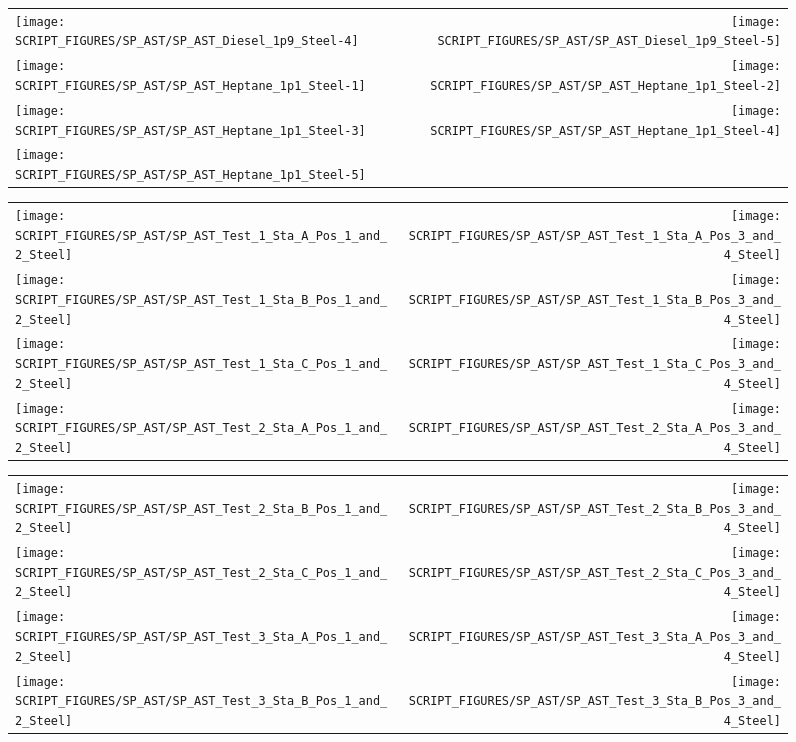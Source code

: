 \begin{figure}[p]
\begin{tabular*}{\textwidth}{l@{\extracolsep{\fill}}r}
\texttt{[image: SCRIPT\_FIGURES/SP\_AST/SP\_AST\_Diesel\_1p9\_Steel-4]} &
\texttt{[image: SCRIPT\_FIGURES/SP\_AST/SP\_AST\_Diesel\_1p9\_Steel-5]} \\
\texttt{[image: SCRIPT\_FIGURES/SP\_AST/SP\_AST\_Heptane\_1p1\_Steel-1]} &
\texttt{[image: SCRIPT\_FIGURES/SP\_AST/SP\_AST\_Heptane\_1p1\_Steel-2]} \\
\texttt{[image: SCRIPT\_FIGURES/SP\_AST/SP\_AST\_Heptane\_1p1\_Steel-3]} &
\texttt{[image: SCRIPT\_FIGURES/SP\_AST/SP\_AST\_Heptane\_1p1\_Steel-4]} \\
\texttt{[image: SCRIPT\_FIGURES/SP\_AST/SP\_AST\_Heptane\_1p1\_Steel-5]} 
\end{tabular*}
\end{figure}

\begin{figure}[p]
\begin{tabular*}{\textwidth}{l@{\extracolsep{\fill}}r}
\texttt{[image: SCRIPT\_FIGURES/SP\_AST/SP\_AST\_Test\_1\_Sta\_A\_Pos\_1\_and\_2\_Steel]} &
\texttt{[image: SCRIPT\_FIGURES/SP\_AST/SP\_AST\_Test\_1\_Sta\_A\_Pos\_3\_and\_4\_Steel]} \\
\texttt{[image: SCRIPT\_FIGURES/SP\_AST/SP\_AST\_Test\_1\_Sta\_B\_Pos\_1\_and\_2\_Steel]} &
\texttt{[image: SCRIPT\_FIGURES/SP\_AST/SP\_AST\_Test\_1\_Sta\_B\_Pos\_3\_and\_4\_Steel]} \\
\texttt{[image: SCRIPT\_FIGURES/SP\_AST/SP\_AST\_Test\_1\_Sta\_C\_Pos\_1\_and\_2\_Steel]} &
\texttt{[image: SCRIPT\_FIGURES/SP\_AST/SP\_AST\_Test\_1\_Sta\_C\_Pos\_3\_and\_4\_Steel]} \\
\texttt{[image: SCRIPT\_FIGURES/SP\_AST/SP\_AST\_Test\_2\_Sta\_A\_Pos\_1\_and\_2\_Steel]} &
\texttt{[image: SCRIPT\_FIGURES/SP\_AST/SP\_AST\_Test\_2\_Sta\_A\_Pos\_3\_and\_4\_Steel]}
\end{tabular*}
\end{figure}

\begin{figure}[p]
\begin{tabular*}{\textwidth}{l@{\extracolsep{\fill}}r}
\texttt{[image: SCRIPT\_FIGURES/SP\_AST/SP\_AST\_Test\_2\_Sta\_B\_Pos\_1\_and\_2\_Steel]} &
\texttt{[image: SCRIPT\_FIGURES/SP\_AST/SP\_AST\_Test\_2\_Sta\_B\_Pos\_3\_and\_4\_Steel]} \\
\texttt{[image: SCRIPT\_FIGURES/SP\_AST/SP\_AST\_Test\_2\_Sta\_C\_Pos\_1\_and\_2\_Steel]} &
\texttt{[image: SCRIPT\_FIGURES/SP\_AST/SP\_AST\_Test\_2\_Sta\_C\_Pos\_3\_and\_4\_Steel]} \\
\texttt{[image: SCRIPT\_FIGURES/SP\_AST/SP\_AST\_Test\_3\_Sta\_A\_Pos\_1\_and\_2\_Steel]} &
\texttt{[image: SCRIPT\_FIGURES/SP\_AST/SP\_AST\_Test\_3\_Sta\_A\_Pos\_3\_and\_4\_Steel]} \\
\texttt{[image: SCRIPT\_FIGURES/SP\_AST/SP\_AST\_Test\_3\_Sta\_B\_Pos\_1\_and\_2\_Steel]} &
\texttt{[image: SCRIPT\_FIGURES/SP\_AST/SP\_AST\_Test\_3\_Sta\_B\_Pos\_3\_and\_4\_Steel]}
\end{tabular*}
\end{figure}

